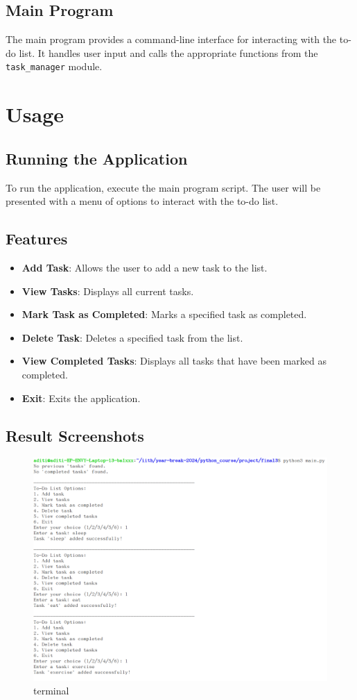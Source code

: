 \documentclass[12pt,a4paper]{report}
\begin{document}
\section{Main Program}
The main program provides a command-line interface for interacting with the to-do list. It handles user input and calls the appropriate functions from the \texttt{task\_manager} module.

\chapter{Usage}
\section{Running the Application}
To run the application, execute the main program script. The user will be presented with a menu of options to interact with the to-do list.

\section{Features}
\begin{itemize}
    \item \textbf{Add Task}: Allows the user to add a new task to the list.
    \item \textbf{View Tasks}: Displays all current tasks.
    \item \textbf{Mark Task as Completed}: Marks a specified task as completed.
    \item \textbf{Delete Task}: Deletes a specified task from the list.
    \item \textbf{View Completed Tasks}: Displays all tasks that have been marked as completed.
    \item \textbf{Exit}: Exits the application.
\end{itemize}

\section{Result Screenshots}
\begin{figure}[htbp]
    \centering
    \includegraphics[width=1\textwidth]{./figs/1.png}
    \caption{terminal}
    \label{fig:ss1}
\end{figure}
\end{document}

